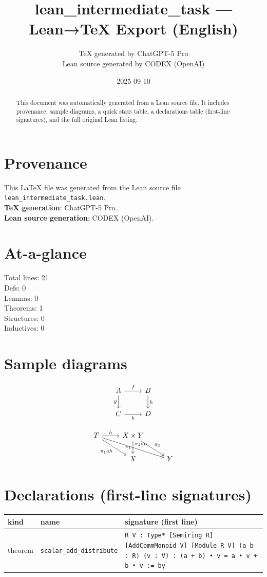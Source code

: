 \documentclass[12pt]{article}
\title{lean\_intermediate\_task — Lean→TeX Export (English)}
\author{TeX generated by ChatGPT-5 Pro\\Lean source generated by CODEX (OpenAI)}
\date{2025-09-10}
\begin{document}
\maketitle

\begin{abstract}
This document was automatically generated from a Lean source file. It includes provenance, sample diagrams, a quick stats table, a declarations table (first-line signatures), and the full original Lean listing.
\end{abstract}

\section*{Provenance}
This \LaTeX{} file was generated from the Lean source file \texttt{lean\_intermediate\_task.lean}.\\
\textbf{TeX generation}: ChatGPT-5 Pro.\\
\textbf{Lean source generation}: CODEX (OpenAI).

\section*{At-a-glance}
Total lines: 21\\
Defs: 0\\
Lemmas: 0\\
Theorems: 1\\
Structures: 0\\
Inductives: 0

\section*{Sample diagrams}

\[
\begin{tikzcd}
A \arrow[r, "f"] \arrow[d, "g"'] & B \arrow[d, "h"] \\
C \arrow[r, "k"'] & D
\end{tikzcd}
\]



\[
\begin{tikzcd}
T \arrow[r, "h"] \arrow[dr, swap, "\pi_1\circ h"] \arrow[drr, "\pi_2\circ h"] & X\times Y \arrow[d, swap, "\pi_1"] \arrow[dr, "\pi_2"] \\
& X & Y
\end{tikzcd}
\]


\section*{Declarations (first-line signatures)} 
\begin{center}
\begin{tabular}{lll}
\textbf{kind} & \textbf{name} & \textbf{signature (first line)} \\ \hline
theorem & \texttt{scalar\_add\_distribute} & \texttt{{R V : Type*} [Semiring R] [AddCommMonoid V] [Module R V] (a b : R) (v : V) : (a + b) • v = a • v + b • v := by} \\
\end{tabular}
\end{center}
\end{document}
